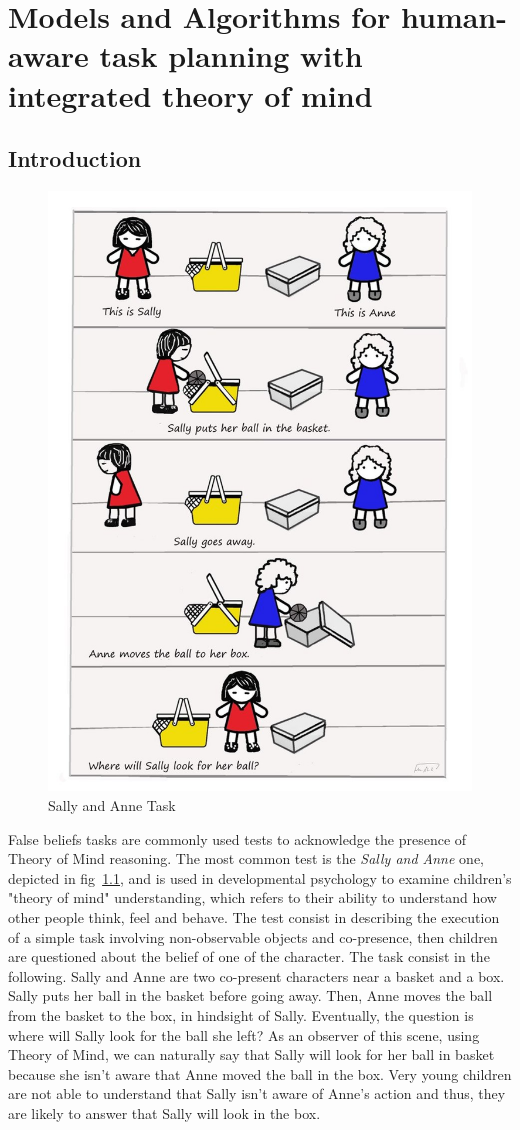 \ifdefined{}
\else
\setcounter{chapter}{2} %
\dominitoc
\faketableofcontents
\fi

\chapter{Models and Algorithms for human-aware task planning with integrated theory of mind}
\label{chap:3}
\minitoc


\section{Introduction}



\begin{figure}
    \centering
    \includegraphics[width=0.5\linewidth]{images/Chapter3/The-Sally-Anne-Task.jpeg}
    \caption{Sally and Anne Task}
    \label{fig:sally_and_anne_task}
\end{figure}

False beliefs tasks are commonly used tests to acknowledge the presence of Theory of Mind reasoning. The most common test is the \textit{Sally and Anne} one, depicted in fig~\ref{fig:sally_and_anne_task}, and is used in developmental psychology to examine children's "theory of mind" understanding, which refers to their ability to understand how other people think, feel and behave. The test consist in describing the execution of a simple task involving non-observable objects and co-presence, then children are questioned about the belief of one of the character. The task consist in the following. Sally and Anne are two co-present characters near a basket and a box. Sally puts her ball in the basket before going away. Then, Anne moves the ball from the basket to the box, in hindsight of Sally. Eventually, the question is where will Sally look for the ball she left? As an observer of this scene, using Theory of Mind, we can naturally say that Sally will look for her ball in basket because she isn't aware that Anne moved the ball in the box. Very young children are not able to understand that Sally isn't aware of Anne's action and thus, they are likely to answer that Sally will look in the box. 

